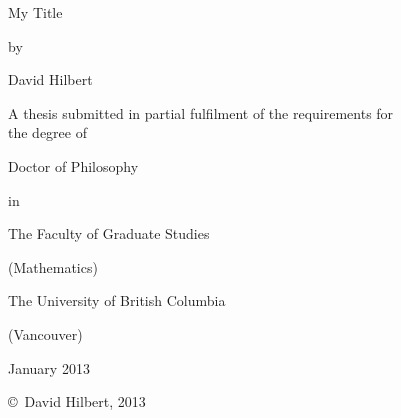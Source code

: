

 \thispagestyle{empty}  %
 
 \begin{center}
 
 \vspace{1.1cm}  %
 
{\LARGE My Title \par}
 
 \vspace{0.8cm}

 by
 
 \vspace{0.8cm}
 
 {\Large David Hilbert} 
 \vspace{1.2cm}
 
A thesis submitted in partial fulfilment of the requirements for \\ the degree of
 \vspace{1.3cm}
 
 {\Large Doctor of Philosophy}
 \vspace{0.8cm}
 
  in
 \vspace{0.8cm}
 
{\Large The Faculty of Graduate Studies} \\
\vspace{0.2cm}

 (Mathematics)
 \vspace{1cm}
 
 
 {\Large The University of British Columbia} \\
 \vspace{0.2cm}
 
 (Vancouver)
 \vspace{3.8cm}
 
 
 

 January 2013
 \vspace{0.4cm}
 
 \copyright \, David Hilbert, 2013
 
 \end{center}






